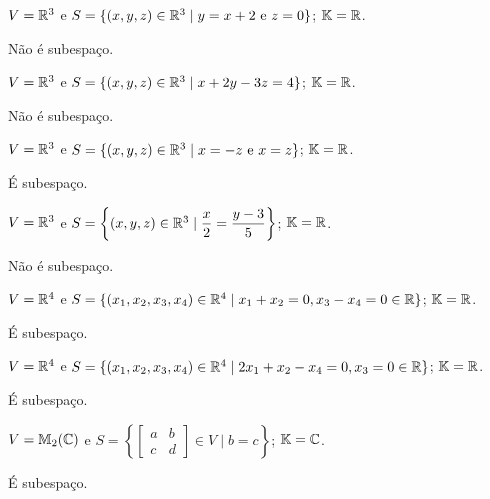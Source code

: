 \documentclass[12pt]{exam}
\begin{document}
\begin{exercicio}
	$V = \mathbb{R}^3$ e $S = \{(x, y, z) \in \mathbb{R}^3 \mid y = x + 2 \mbox{ e } z = 0\}$; $\mathbb{K} = \mathbb{R}$.
	\begin{solucao}
		N\~ao \'e subespa\c{c}o.
	\end{solucao}
\end{exercicio}

\begin{exercicio}
	$V = \mathbb{R}^3$ e $S = \{(x, y, z) \in \mathbb{R}^3 \mid x + 2y -3z = 4\}$; $\mathbb{K} = \mathbb{R}$.
	\begin{solucao}
		N\~ao \'e subespa\c{c}o.
	\end{solucao}
\end{exercicio}

\begin{exercicio}
	$V = \mathbb{R}^3$ e $S = \{(x, y, z) \in \mathbb{R}^3 \mid x = -z \mbox{ e } x = z\}$; $\mathbb{K} = \mathbb{R}$.
	\begin{solucao}
		\'E subespa\c{c}o.
	\end{solucao}
\end{exercicio}

\begin{exercicio}
	$V = \mathbb{R}^3$ e $S = \left\{(x, y, z) \in \mathbb{R}^3 \mid \dfrac{x}{2} = \dfrac{y - 3}{5}\right\}$; $\mathbb{K} = \mathbb{R}$.
	\begin{solucao}
		N\~ao \'e subespa\c{c}o.
	\end{solucao}
\end{exercicio}

\begin{exercicio}
	$V = \mathbb{R}^4$ e $S = \{(x_1, x_2, x_3, x_4) \in \mathbb{R}^4 \mid x_1 + x_2 = 0, x_3 - x_4 = 0 \in \mathbb{R}\}$; $\mathbb{K} = \mathbb{R}$.
	\begin{solucao}
		\'E subespa\c{c}o.
	\end{solucao}
\end{exercicio}

\begin{exercicio}
	$V = \mathbb{R}^4$ e $S = \{(x_1, x_2, x_3, x_4) \in \mathbb{R}^4 \mid 2x_1 + x_2 - x_4 = 0, x_3 = 0 \in \mathbb{R}\}$; $\mathbb{K} = \mathbb{R}$.
	\begin{solucao}
		\'E subespa\c{c}o.
	\end{solucao}
\end{exercicio}

\begin{exercicio}
	$V = \mathbb{M}_2(\mathbb{C})$ e $S = \left\{\begin{bmatrix} a & b\\ c & d\end{bmatrix} \in V \mid b = c\right\}$; $\mathbb{K} = \mathbb{C}$.
	\begin{solucao}
		\'E subespa\c{c}o.
	\end{solucao}
\end{exercicio}
\end{document}

